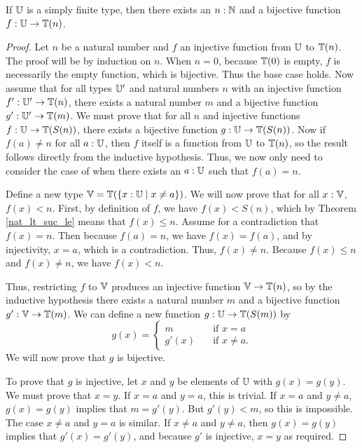 \documentclass[../math.tex]{subfiles}
\begin{document}
\begin{theorem} \label{simple_finite_bij}
    If $\mathbb{U}$ is a simply finite type, then there exists an $n : \mathbb{N}$ and a
    bijective function $f : \mathbb{U} \to \mathbb{T}(n)$.
\end{theorem}
\begin{proof}
    Let $n$ be a natural number and $f$ an injective function from $\mathbb{U}$ to
    $\mathbb{T}(n)$.  The proof will be by induction on $n$.  When $n = 0$, because
    $\mathbb{T}(0)$ is empty, $f$ is necessarily the empty function, which is bijective.
    Thus the base case holds.  Now assume that for all types $\mathbb{U}'$ and natural
    numbers $n$ with an injective function $f' : \mathbb{U}' \to \mathbb{T}(n)$, there exists a
    natural number $m$ and a bijective function $g' : \mathbb{U}' \to \mathbb{T}(m)$.  We must
    prove that for all $n$ and injective functions $f : \mathbb{U} \to \mathbb{T}(S(n))$, there
    exists a bijective function $g : \mathbb{U} \to \mathbb{T}(S(n))$.  Now if $f(a) \neq n$ for
    all $a : \mathbb{U}$, then $f$ itself is a function from $\mathbb{U}$ to $\mathbb{T}(n)$, so the
    result follows directly from the inductive hypothesis.  Thus, we now only
    need to consider the case of when there exists an $a : \mathbb{U}$ such that $f(a) =
    n$.

    Define a new type $\mathbb{V} = \mathbb{T}(\{x : \mathbb{U} \mid x \neq a\})$.  We will now prove
    that for all $x : \mathbb{V}$, $f(x) < n$.  First, by definition of $f$, we have
    $f(x) < S(n)$, which by Theorem \ref{nat_lt_suc_le} means that $f(x) \leq
    n$.  Assume for a contradiction that $f(x) = n$.  Then because $f(a) = n$,
    we have $f(x) = f(a)$, and by injectivity, $x = a$, which is a
    contradiction.  Thus, $f(x) \neq n$.  Because $f(x) \leq n$ and $f(x) \neq
    n$, we have $f(x) < n$.

    Thus, restricting $f$ to $\mathbb{V}$ produces an injective function $\mathbb{V} \to \mathbb{T}(n)$,
    so by the inductive hypothesis there exists a natural number $m$ and a
    bijective function $g' : \mathbb{V} \to \mathbb{T}(m)$.  We can define a new function $g :
    \mathbb{U} \to \mathbb{T}(S(m))$ by
    \[
        g(x) = \begin{cases}
            m \quad &\text{if $x = a$} \\
            g'(x) \quad &\text{if $x \neq a$.}
        \end{cases}
    \]
    We will now prove that $g$ is bijective.

    To prove that $g$ is injective, let $x$ and $y$ be elements of $\mathbb{U}$ with
    $g(x) = g(y)$.  We must prove that $x = y$.  If $x = a$ and $y = a$, this is
    trivial.  If $x = a$ and $y \neq a$, $g(x) = g(y)$ implies that $m = g'(y)$.
    But $g'(y) < m$, so this is impossible.  The case $x \neq a$ and $y = a$ is
    similar.  If $x \neq a$  and $y \neq a$, then $g(x) = g(y)$ implies that
    $g'(x) = g'(y)$, and because $g'$ is injective, $x = y$ as required.


\end{proof}
\end{document}
